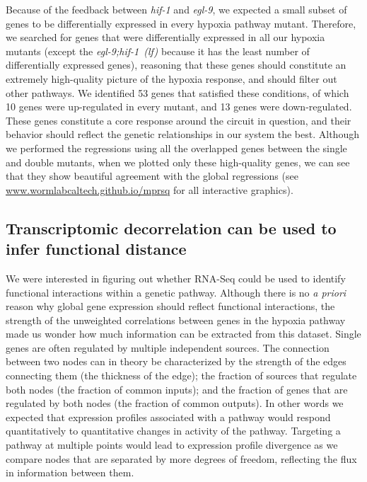 \documentclass[9pt,twocolumn,twoside]{pnas-new}
\newcommand{\gene}[1]{\emph{#1}}
\newcommand{\eglhif}{\emph{egl-9;hif-1~(lf)}}
\newcommand{\inall}{53}
\newcommand{\allup}{10}
\newcommand{\alldown}{13}
\begin{document}
Because of the feedback between \gene{hif-1} and \gene{egl-9}, we expected a small
subset of genes to be differentially expressed in every hypoxia pathway mutant.
Therefore, we searched for genes that were differentially expressed in all our
hypoxia mutants (except the \eglhif{} because it has the least number
of differentially expressed genes), reasoning that these genes should constitute
an extremely high-quality picture of the hypoxia response, and should filter out other
pathways.
We identified \inall{} genes that satisfied these conditions, of which \allup{}
genes were up-regulated in every mutant, and \alldown{} genes were down-regulated.
These genes constitute a core response around the
circuit in question, and their behavior should reflect the genetic relationships
in our system the best. Although we performed the regressions using all the
overlapped genes between the single and double mutants, when we plotted only
these high-quality genes, we can see that they show beautiful agreement with the
global regressions (see \url{www.wormlabcaltech.github.io/mprsq} for all
interactive graphics).

\subsection*{Transcriptomic decorrelation can be used to infer functional distance}
\label{sub:decorrelation}

We were interested in figuring out whether RNA-Seq could be used to identify
functional interactions within a genetic pathway. Although there is no \emph{a
priori} reason why global gene expression should reflect functional interactions,
the strength of the unweighted correlations between genes in the hypoxia pathway
made us wonder how much information can be extracted from this dataset. Single
genes are often regulated by multiple independent sources. The connection between
two nodes can in theory be characterized by the strength of the edges connecting
them (the thickness of the edge); the fraction of sources that regulate both
nodes (the fraction of common inputs); and the fraction of genes that are
regulated by both nodes (the fraction of common outputs).
In other words we expected that expression profiles associated with a pathway
would respond quantitatively to quantitative changes in activity of the pathway.
Targeting a pathway at multiple points would lead to expression profile
divergence as we compare nodes that are separated by more degrees of freedom,
reflecting the flux in information between them.
\end{document}
